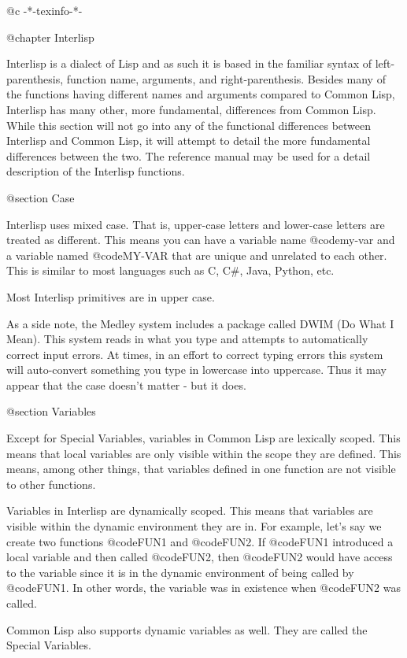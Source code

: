 @c -*-texinfo-*-

@chapter Interlisp

Interlisp is a dialect of Lisp and as such it is based in the familiar
syntax of left-parenthesis, function name, arguments, and
right-parenthesis.  Besides many of the functions having different
names and arguments compared to Common Lisp, Interlisp has many other,
more fundamental, differences from Common Lisp.  While this section
will not go into any of the functional differences between Interlisp
and Common Lisp, it will attempt to detail the more fundamental
differences between the two.  The reference manual may be used for a
detail description of the Interlisp functions.

@section Case

Interlisp uses mixed case.  That is, upper-case letters and lower-case
letters are treated as different.  This means you can have a variable
name @code{my-var} and a variable named @code{MY-VAR} that are unique and
unrelated to each other.  This is similar to most languages such as
C, C#, Java, Python, etc.

Most Interlisp primitives are in upper case.

As a side note, the Medley system includes a package called DWIM (Do
What I Mean).  This system reads in what you type and attempts to
automatically correct input errors.  At times, in an effort to correct
typing errors this system will auto-convert something you type in
lowercase into uppercase.  Thus it may appear that the case doesn't
matter - but it does.

@section Variables

Except for Special Variables, variables in Common Lisp are lexically
scoped.  This means that local variables are only visible within the
scope they are defined.  This means, among other things, that
variables defined in one function are not visible to other functions.

Variables in Interlisp are dynamically scoped.  This means that variables
are visible within the dynamic environment they are in.  For example,
let's say we create two functions @code{FUN1} and @code{FUN2}.  If @code{FUN1}
introduced a local variable and then called @code{FUN2}, then @code{FUN2} 
would have access to the variable since it is in the dynamic environment
of being called by @code{FUN1}.  In other words, the variable was in existence
when @code{FUN2} was called.  

Common Lisp also supports dynamic variables as well.  They are called
the Special Variables.

